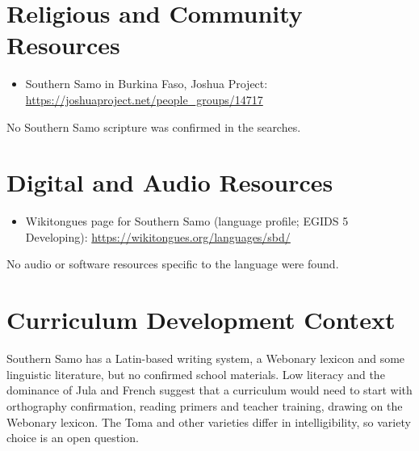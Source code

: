 \documentclass[12pt]{article}
\begin{document}
\section{Religious and Community Resources}
\begin{itemize}
\item Southern Samo in Burkina Faso, Joshua Project: \url{https://joshuaproject.net/people_groups/14717}
\end{itemize}
No Southern Samo scripture was confirmed in the searches.

\section{Digital and Audio Resources}
\begin{itemize}
\item Wikitongues page for Southern Samo (language profile; EGIDS 5 Developing): \url{https://wikitongues.org/languages/sbd/}
\end{itemize}
No audio or software resources specific to the language were found.

\section{Curriculum Development Context}
Southern Samo has a Latin-based writing system, a Webonary lexicon and some linguistic literature, but no confirmed school materials. Low literacy and the dominance of Jula and French suggest that a curriculum would need to start with orthography confirmation, reading primers and teacher training, drawing on the Webonary lexicon. The Toma and other varieties differ in intelligibility, so variety choice is an open question.
\end{document}
